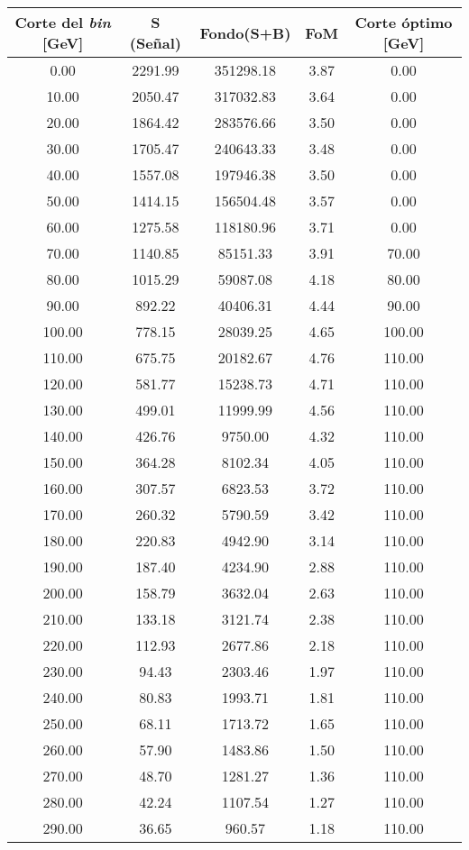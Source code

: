 \begin{table}[h!]
\centering
\begin{tabular}{ |c|c|c|c|c| }
 \hline
Corte del \textit{bin} [GeV]  & S (Señal) &  Fondo(S+B)  & FoM &  Corte óptimo [GeV] \\    \hline
0.00 & 2291.99 & 351298.18 & 3.87 & 0.00 \\
 \hline
10.00 & 2050.47 & 317032.83 & 3.64 & 0.00 \\
 \hline
20.00 & 1864.42 & 283576.66 & 3.50 & 0.00 \\
 \hline
30.00 & 1705.47 & 240643.33 & 3.48 & 0.00 \\
 \hline
40.00 & 1557.08 & 197946.38 & 3.50 & 0.00 \\
 \hline
50.00 & 1414.15 & 156504.48 & 3.57 & 0.00 \\
 \hline
60.00 & 1275.58 & 118180.96 & 3.71 & 0.00 \\
 \hline
70.00 & 1140.85 & 85151.33 & 3.91 & 70.00 \\
 \hline
80.00 & 1015.29 & 59087.08 & 4.18 & 80.00 \\
 \hline
90.00  & 892.22 & 40406.31 & 4.44 & 90.00 \\
 \hline
100.00 & 778.15 & 28039.25 & 4.65 & 100.00 \\
 \hline
110.00 & 675.75 & 20182.67 & 4.76 & 110.00 \\
 \hline
120.00 & 581.77 & 15238.73 & 4.71 & 110.00 \\
 \hline
130.00 & 499.01 & 11999.99 & 4.56 & 110.00 \\
 \hline
140.00 & 426.76 & 9750.00 & 4.32 & 110.00 \\
 \hline
150.00 & 364.28 & 8102.34 & 4.05 & 110.00 \\
 \hline
160.00 & 307.57 & 6823.53 & 3.72 & 110.00 \\
 \hline
170.00 & 260.32 & 5790.59 & 3.42 & 110.00 \\
 \hline
180.00 & 220.83 & 4942.90 & 3.14 & 110.00 \\
 \hline
190.00 & 187.40 & 4234.90 & 2.88 & 110.00 \\
 \hline
200.00 & 158.79 & 3632.04 & 2.63 & 110.00 \\
 \hline
210.00 & 133.18 & 3121.74 & 2.38  & 110.00 \\
 \hline
220.00 & 112.93 & 2677.86 & 2.18 & 110.00 \\
 \hline
230.00 & 94.43 & 2303.46 & 1.97 & 110.00 \\
 \hline
240.00 & 80.83 & 1993.71 & 1.81 & 110.00 \\
 \hline
250.00 & 68.11 & 1713.72 & 1.65 & 110.00 \\
 \hline
260.00 & 57.90 & 1483.86 & 1.50 & 110.00 \\
 \hline
270.00 & 48.70 & 1281.27 & 1.36 & 110.00 \\
 \hline
280.00 & 42.24 & 1107.54 & 1.27 & 110.00 \\
 \hline
290.00 & 36.65 & 960.57 & 1.18 & 110.00 \\
 \hline


\end{tabular}
\end{table}
